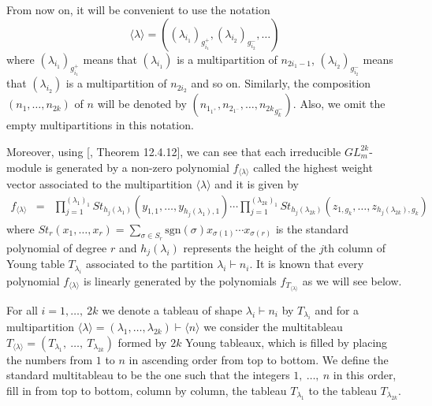 \documentclass{amsart}
\numberwithin{equation}{section}
\begin{document}
From now on, it will be convenient to use the notation  
\begin{equation}\label{eq 3}
\langle \lambda \rangle = ((\lambda_{i_1})_{{g_{i_1}^+}}, (\lambda_{i_2})_{g_{i_2}^-}, \ldots  )
\end{equation}
where  $(\lambda_{i_1})_{{g_{i_1}^+}}$  means that $(\lambda_{i_1})$ is a multipartition of $n_{2i_1-1}$, $(\lambda_{i_2})_{g_{i_2}^-}$ means that $(\lambda_{i_2})$ is a multipartition of $n_{2i_2}$ and so on.  Similarly, the composition $(n_1, \ldots, n_{2k})$ of $n$ will be denoted by $(n_{1_{1^+}},n_{2_{1^-}}, \ldots, {n_{2k}}_{g_k^-})$. Also,
we omit the empty multipartitions in this notation.

Moreover, using [\cite{Dr}, Theorem 12.4.12], we can see that each irreducible $GL^{2k}_m$-module is generated by a non-zero polynomial $f_{\langle \lambda \rangle}$  called the
highest weight vector associated to the multipartition $\langle \lambda \rangle$ and it is given by
$$\begin{array}{cclc}	
	
	f_{{\langle \lambda \rangle}} &=&\prod\limits_{j=1}^{(\lambda_1)_1}St_{{h_j}(\lambda_1)}(y_{1,1}, \ldots, y_{{h_j}(\lambda_1),1})  \cdots \prod\limits_{j=1}^{(\lambda_{2k})_1}St_{{h_j}(\lambda_{2k})}(z_{1,g_k}, \ldots, z_{{h_j}(\lambda_{2k}),g_k})
\end{array}$$
where $St_r(x_1, \ldots , x_r) = \sum\limits_{\sigma \in S_r}\mbox{sgn}(\sigma)x_{\sigma(1)}\cdots x_{\sigma(r)}$ is the standard polynomial of degree $r$ and $h_j(\lambda_{i})$  represents the height of the $j$th column of Young table $T_{\lambda_{i}}$ associated to the partition $\lambda_i\vdash n_i.$ It is known that
every polynomial $f_{\langle \lambda \rangle}$ is linearly generated by the polynomials $f_{T_{\langle \lambda \rangle}}$ as we will see below. 



For all $i = 1, \ldots ,~ 2k$ we denote a tableau of shape $\lambda_i \vdash n_i$ by $T_{\lambda_i}$ and for a multipartition $\langle \lambda \rangle =
(\lambda_1, \ldots, \lambda_{2k}) \vdash \langle n \rangle$ we consider the multitableau $T_{\langle \lambda \rangle} = (T_{\lambda_1} , ~\ldots ,~ T_{\lambda_{2k}} )$ formed by $2k$ Young tableaux, which
is filled by placing the numbers from $1$ to $n$ in ascending order from top to bottom. We define the standard
multitableau to be the one such that the integers $1, ~\ldots ,~ n$ in this order, fill in from top to bottom, column by
column, the tableau $T_{\lambda_{1}}$ to the tableau $T_{\lambda_{2k}} .$ 
\end{document}
